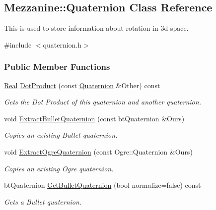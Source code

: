\hypertarget{classMezzanine_1_1Quaternion}{
\subsection{Mezzanine::Quaternion Class Reference}
\label{classMezzanine_1_1Quaternion}
}


This is used to store information about rotation in 3d space.  




{\ttfamily \#include $<$quaternion.h$>$}

\subsubsection*{Public Member Functions}
\begin{DoxyCompactItemize}
\item 
\hyperlink{namespaceMezzanine_a726731b1a7df72bf3583e4a97282c6f6}{Real} \hyperlink{classMezzanine_1_1Quaternion_af06c0fa923c0bb9ede40c2973f202684}{DotProduct} (const \hyperlink{classMezzanine_1_1Quaternion}{Quaternion} \&Other) const 
\begin{DoxyCompactList}\small\item\em Gets the Dot Product of this quaternion and another quaternion. \item\end{DoxyCompactList}\item 
void \hyperlink{classMezzanine_1_1Quaternion_ad7d7badf6fff44472fea618647866d8c}{ExtractBulletQuaternion} (const btQuaternion \&Ours)
\begin{DoxyCompactList}\small\item\em Copies an existing Bullet quaternion. \item\end{DoxyCompactList}\item 
void \hyperlink{classMezzanine_1_1Quaternion_a7d5ae58c94f439d185939a58c773df80}{ExtractOgreQuaternion} (const Ogre::Quaternion \&Ours)
\begin{DoxyCompactList}\small\item\em Copies an existing Ogre quaternion. \item\end{DoxyCompactList}\item 
btQuaternion \hyperlink{classMezzanine_1_1Quaternion_a6d6b23f7ca6e8521873cd7c6198d7613}{GetBulletQuaternion} (bool normalize=false) const 
\begin{DoxyCompactList}\small\item\em Gets a Bullet quaternion. \item\end{DoxyCompactList}\item 

\end{DoxyCompactItemize}
